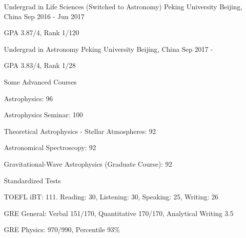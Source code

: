 


\begin{cventries}


\cventry
{Undergrad in Life Sciences (Switched to Astronomy)} %
{Peking University} %
{Beijing, China} %
{Sep 2016 - Jun 2017} %
{ %
	\begin{cvitems}
		\item {GPA 3.87/4, Rank 1/120}
	\end{cvitems}
}

\cventry
{Undergrad in Astronomy} %
{Peking University} %
{Beijing, China} %
{Sep 2017 - } %
{ %
	\begin{cvitems}
		\item {GPA 3.83/4, Rank 1/28}
	\end{cvitems}
}

\cventry
{Some Advanced Courses} %
{} %
{} %
{} %
{ %
	\begin{cvitems}
		\item {Astrophysics: 96}
		\item {Astrophysics Seminar: 100}
		\item {Theoretical Astrophysics - Stellar Atmospheres: 92}
		\item {Astronomical Spectroscopy: 92}
		\item {Gravitational-Wave Astrophysics (Graduate Course): 92}
	\end{cvitems}
}

\cventry
{Standardized Tests} %
{} %
{} %
{} %
{ %
	\begin{cvitems}
		\item {TOEFL iBT: 111. Reading: 30, Listening: 30, Speaking: 25, Writing: 26}
		\item {GRE General: Verbal 151/170, Quantitative 170/170, Analytical Writing 3.5}
		\item {GRE Physics: 970/990, Percentile 93\%}
	\end{cvitems}
}


\end{cventries}